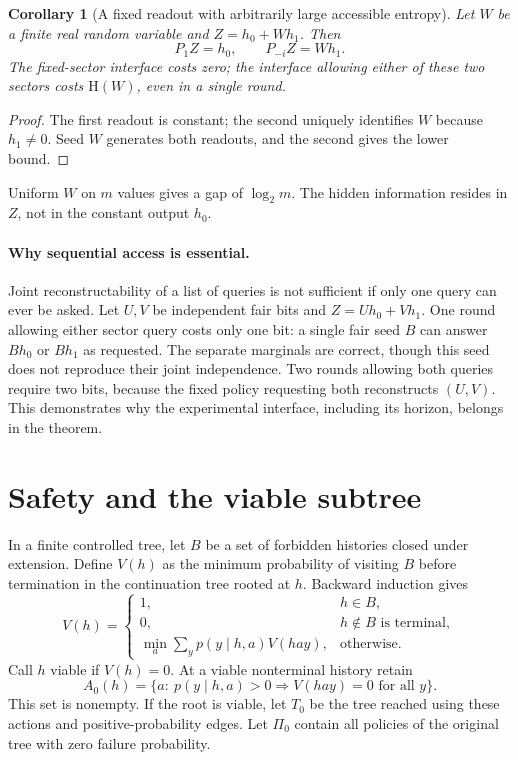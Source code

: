 \documentclass[11pt]{article}
\newtheorem{corollary}[theorem]{Corollary}
\theoremstyle{remark}\newtheorem{remark}[theorem]{Remark}
\newcommand{\HH}{\mathrm H}
\begin{document}
\begin{corollary}[A fixed readout with arbitrarily large accessible entropy]
Let $W$ be a finite real random variable and $Z=h_0+Wh_1$. Then
\[
 P_1Z=h_0,\qquad P_{-i}Z=Wh_1.
\]
The fixed-sector interface costs zero; the interface allowing either of these
two sectors costs $\HH(W)$, even in a single round.
\end{corollary}
\begin{proof}
The first readout is constant; the second uniquely identifies $W$ because
$h_1\ne0$. Seed $W$ generates both readouts, and the second gives the lower bound.
\end{proof}
Uniform $W$ on $m$ values gives a gap of $\log_2m$. The hidden information
resides in $Z$, not in the constant output $h_0$.

\paragraph{Why sequential access is essential.}
Joint reconstructability of a list of queries is not sufficient if only one
query can ever be asked. Let $U,V$ be independent fair bits and
$Z=Uh_0+Vh_1$. One round allowing either sector query costs only one bit: a
single fair seed $B$ can answer $Bh_0$ or $Bh_1$ as requested. The separate
marginals are correct, though this seed does not reproduce their joint
independence. Two rounds allowing both queries require two bits, because
the fixed policy requesting both reconstructs $(U,V)$. This demonstrates why
the experimental interface, including its horizon, belongs in the theorem.

\section{Safety and the viable subtree}
In a finite controlled tree, let $B$ be a set of forbidden histories closed under
extension. Define $V(h)$ as the minimum probability of visiting $B$ before
termination in the continuation tree rooted at $h$. Backward induction gives
\[
 V(h)=\begin{cases}
 1,&h\in B,\\
 0,&h\notin B\text{ is terminal},\\
 \min_a\sum_y p(y\mid h,a)V(hay),&\text{otherwise}.
 \end{cases}
\]
Call $h$ viable if $V(h)=0$. At a viable nonterminal history retain
\[
 A_0(h)=\{a:\ p(y\mid h,a)>0\Rightarrow V(hay)=0\text{ for all }y\}.
\]
This set is nonempty. If the root is viable, let $T_0$ be the tree reached
using these actions and positive-probability edges. Let $\Pi_0$ contain all
policies of the original tree with zero failure probability.
\end{document}

